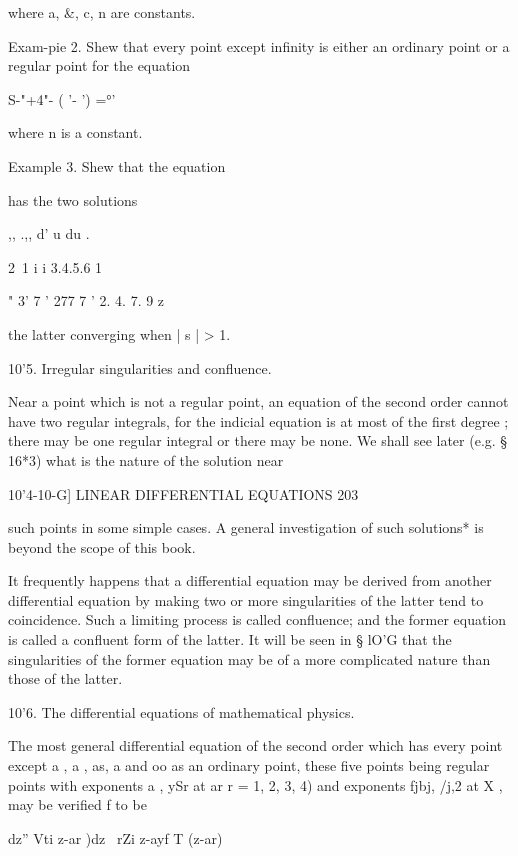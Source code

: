 where a, \&, c, n are constants.

Exam-pie 2. Shew that every point except infinity is either an
ordinary point or a regular point for the equation



 S-"+4"- ( '- ') =°'



where n is a constant.



Example 3. Shew that the equation



has the two solutions



,, .,, d' u du .

2\ 1 i i 3.4.5.6 1

 " 3' 7 ' 277 7 ' 2. 4. 7. 9 z



the latter converging when | s | > 1.

10'5. Irregular singularities and confluence.

Near a point which is not a regular point, an equation of the second
order cannot have two regular integrals, for the indicial equation is
at most of the first degree ; there may be one regular integral or
there may be none. We shall see later (e.g. § 16*3) what is the nature
of the solution near



10'4-10-G] LINEAR DIFFERENTIAL EQUATIONS 203

such points in some simple cases. A general investigation of such
solutions* is beyond the scope of this book.

It frequently happens that a differential equation may be derived from
another differential equation by making two or more singularities of
the latter tend to coincidence. Such a limiting process is called
confluence; and the former equation is called a confluent form of the
latter. It will be seen in § lO'G that the singularities of the former
equation may be of a more complicated nature than those of the latter.

10'6. The differential equations of mathematical physics.

The most general differential equation of the second order which has
every point except a , a , as, a and oo as an ordinary point, these
five points being regular points with exponents a , ySr at ar r = 1,
2, 3, 4) and exponents fjbj, /j,2 at X , may be verified f to be

dz'' Vti z-ar )dz \ rZi z-ayf T (z-ar)


